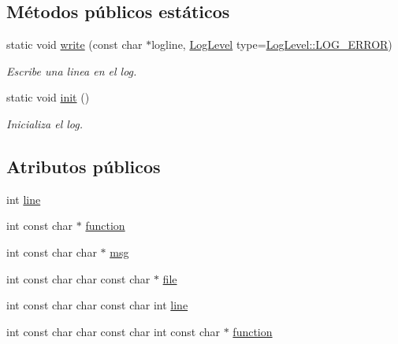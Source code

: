 \subsection*{Métodos públicos estáticos}
\begin{DoxyCompactItemize}
\item 
static void \hyperlink{class_i3_d_1_1_log_msg_a71c24601dd2d2ff79422e1dc718ae722}{write} (const char $\ast$logline, \hyperlink{namespace_i3_d_ae1af0f2e3b629610c45222809ff521f6}{Log\+Level} type=\hyperlink{namespace_i3_d_ae1af0f2e3b629610c45222809ff521f6a4490aa3d29644e716440fada68f54032}{Log\+Level\+::\+L\+O\+G\+\_\+\+E\+R\+R\+OR})
\begin{DoxyCompactList}\small\item\em Escribe una linea en el log. \end{DoxyCompactList}\item 
static void \hyperlink{class_i3_d_1_1_log_msg_a147319e07090ca301b9ade50125aa13b}{init} ()
\begin{DoxyCompactList}\small\item\em Inicializa el log. \end{DoxyCompactList}\end{DoxyCompactItemize}
\subsection*{Atributos públicos}
\begin{DoxyCompactItemize}
\item 
int \hyperlink{class_i3_d_1_1_log_msg_a56ecd5ab4bfe94a82004dbeca84915b5}{line}
\item 
int const char $\ast$ \hyperlink{class_i3_d_1_1_log_msg_aadb5ccd21e1dbbd3d40b631146dbddd3}{function}
\item 
int const char char $\ast$ \hyperlink{class_i3_d_1_1_log_msg_a5a1ceb27d9529de8eb9b3fc9377e178a}{msg}
\item 
int const char char const char $\ast$ \hyperlink{class_i3_d_1_1_log_msg_ab59f20d39ef112d2196371ae0636d77c}{file}
\item 
int const char char const char int \hyperlink{class_i3_d_1_1_log_msg_a56ecd5ab4bfe94a82004dbeca84915b5}{line}
\item 
int const char char const char int const char $\ast$ \hyperlink{class_i3_d_1_1_log_msg_a474c5077b30bea5b07a1a6ef7f2d82ea}{function}
\end{DoxyCompactItemize}
